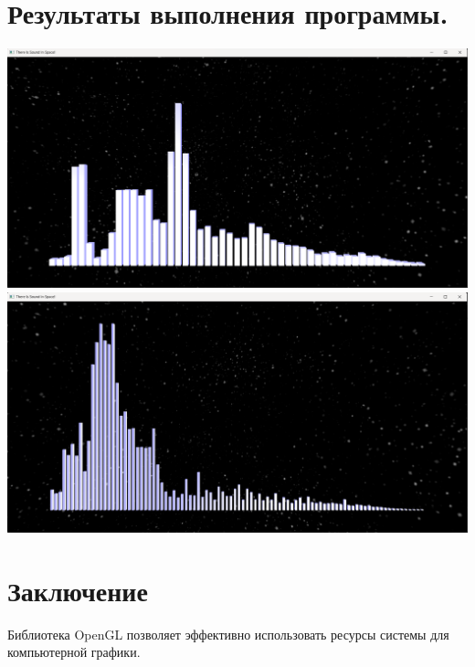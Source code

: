 \documentclass[a4paper,14pt]{extarticle}
\begin{document}
\section{Результаты выполнения программы.}
\begin{center}
    \includegraphics[width=200mm]{res1.png}
    \includegraphics[width=200mm]{res2.png}
\end{center}

\section{Заключение}
Библиотека OpenGL позволяет эффективно использовать ресурсы системы для 
компьютерной графики.
\end{document}
